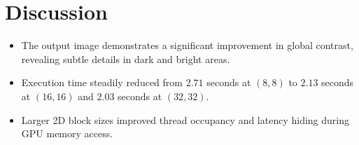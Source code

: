 \documentclass{article}
\begin{document}
\section{Discussion}
\begin{itemize}
    \item The output image demonstrates a significant improvement in global contrast, revealing subtle details in dark and bright areas.
    \item Execution time steadily reduced from $2.71$ seconds at $(8, 8)$ to $2.13$ seconds at $(16, 16)$ and $2.03$ seconds at $(32, 32)$.
    \item Larger 2D block sizes improved thread occupancy and latency hiding during GPU memory access.
\end{itemize}
\end{document}

